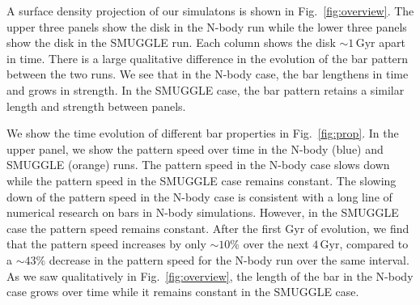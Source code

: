 \documentclass{natureprintstyle}
\begin{document}
A surface density projection of our simulatons is shown in
Fig.~\ref{fig:overview}. The upper three panels show the disk in the N-body
run while the lower three panels show the disk in the SMUGGLE run. Each column
shows the disk $\sim1\,\textrm{Gyr}$ apart in time. There is a large qualitative
difference in the evolution of the bar pattern between the two runs. We see
that in the N-body case, the bar lengthens in time and grows in strength. In
the SMUGGLE case, the bar pattern retains a similar length and strength
between panels.

We show the time evolution of different bar properties in Fig.~\ref{fig:prop}.
In the upper panel, we show the pattern speed over time in the N-body (blue)
and SMUGGLE (orange) runs. The pattern speed in the N-body case slows down
while the pattern speed in the SMUGGLE case remains constant. The slowing down
of the pattern speed in the N-body case is consistent with a long line of
numerical research on bars in N-body simulations\cite{1992ApJ...400...80H,
2000ApJ...543..704D, 2002MNRAS.330...35A, 2002ApJ...569L..83A,
2003MNRAS.341.1179A, 2003MNRAS.346..251O, 2005MNRAS.363..991H,
2006ApJ...637..214M, 2007MNRAS.375..460W, 2009ApJ...697..293D}. However, in
the SMUGGLE case the pattern speed remains constant. After the first Gyr of
evolution, we find that the pattern speed increases by only $\sim10\%$ over
the next $4\,\textrm{Gyr}$, compared to a $\sim43\%$ decrease in the pattern
speed for the N-body run over the same interval. As we saw
qualitatively in Fig.~\ref{fig:overview}, the length of the bar in the N-body
case grows over time while it remains constant in the SMUGGLE case.
\end{document}
